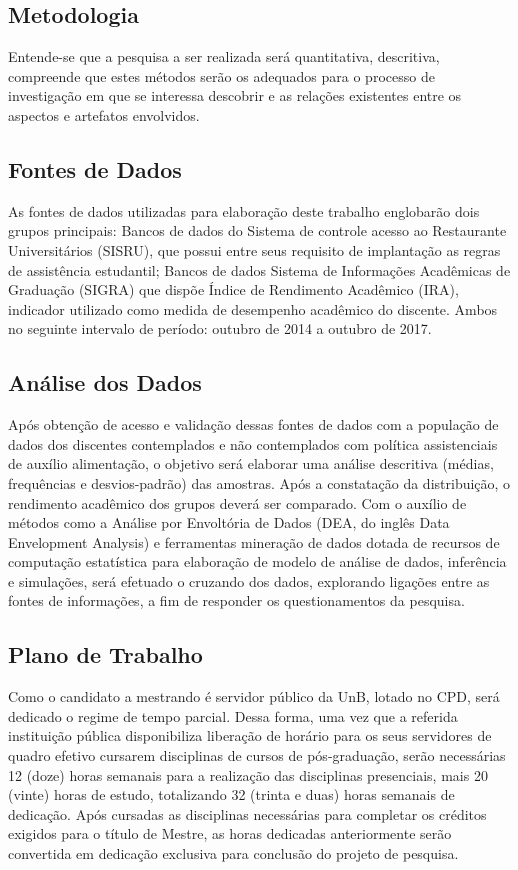 \subsection{Metodologia}
Entende-se que a pesquisa a ser realizada será quantitativa, descritiva, compreende que estes métodos serão os adequados para o processo de investigação em que se interessa descobrir e as relações existentes entre os aspectos e artefatos envolvidos.
\subsection{Fontes de Dados}
As fontes de dados utilizadas para elaboração deste trabalho englobarão dois grupos principais: 
Bancos de dados do Sistema de controle acesso ao Restaurante Universitários (SISRU), que possui entre seus requisito de implantação as regras de assistência estudantil;
Bancos de dados Sistema de Informações Acadêmicas de Graduação (SIGRA) que dispõe Índice de Rendimento Acadêmico (IRA), indicador utilizado como medida de desempenho acadêmico do discente. 
Ambos no seguinte intervalo de período: outubro de 2014 a outubro de 2017.
\subsection{Análise dos Dados}
Após obtenção de acesso e validação dessas fontes de dados com a população de dados dos discentes contemplados e não contemplados com política assistenciais de auxílio alimentação, o objetivo será elaborar uma análise descritiva (médias, frequências e desvios-padrão) das amostras. Após a constatação da distribuição, o rendimento acadêmico dos grupos deverá ser comparado. 
Com o auxílio de métodos como a Análise por Envoltória de Dados (DEA, do inglês Data Envelopment Analysis) e ferramentas mineração de dados dotada de recursos de computação estatística para elaboração de modelo de análise de dados, inferência e simulações, será efetuado o cruzando dos dados, explorando ligações entre as fontes de informações, a fim de responder os questionamentos da pesquisa.
\subsection{Plano de Trabalho}
Como o candidato a mestrando é servidor público da UnB, lotado no CPD, será dedicado o regime de tempo parcial. Dessa forma, uma vez que a referida instituição pública disponibiliza liberação de horário para os seus servidores de quadro efetivo cursarem disciplinas de cursos de pós-graduação, serão necessárias 12 (doze) horas semanais para a realização das disciplinas presenciais, mais 20 (vinte) horas de estudo, totalizando 32 (trinta e duas) horas semanais de dedicação. Após cursadas as disciplinas necessárias para completar os créditos exigidos para o título de Mestre, as horas dedicadas anteriormente serão convertida em dedicação exclusiva para conclusão do projeto de pesquisa.
